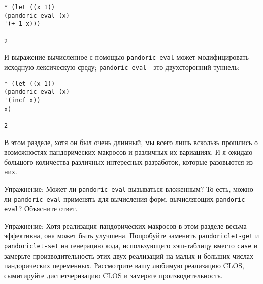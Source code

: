 \begin{verbatim}
* (let ((x 1))
(pandoric-eval (x)
'(+ 1 x)))

2
\end{verbatim}

И выражение вычисленное с помощью \verb"pandoric-eval" может модифицировать исходную лексическую среду; \verb"pandoric-eval" - это двухсторонний туннель:

\begin{verbatim}
* (let ((x 1))
(pandoric-eval (x)
'(incf x))
x)

2
\end{verbatim}

В этом разделе, хотя он был очень длинный, мы всего лишь вскользь прошлись о возможностях пандорических макросов и различных их вариациях. И я ожидаю большого количества различных интересных разработок, которые разовьются из них.

Упражнение: Может ли \verb"pandoric-eval" вызываться вложенным? То есть, можно ли \verb"pandoric-eval" применять для вычисления форм, вычисляющих \verb"pandoric-eval"? Объясните ответ.

Упражнение: Хотя реализация пандорических макросов в этом разделе весьма эффективна, она может быть улучшена. Попробуйте заменить \verb"pandoriclet-get" и \verb"pandoriclet-set" на генерацию кода, использующего хэш-таблицу вместо \verb"case" и замерьте производительность этих двух реализаций на малых и больших числах пандорических переменных. Рассмотрите вашу любимую реализацию CLOS, сымитируйте диспетчеризацию CLOS и замерьте производительность.
